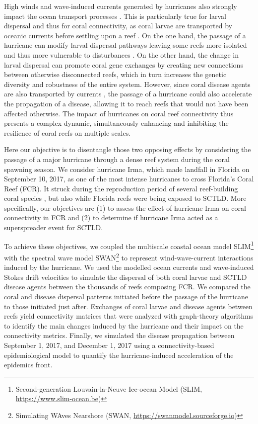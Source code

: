 \documentclass[fleqn,10pt]{wlscirep}
\begin{document}
High winds and wave-induced currents generated by hurricanes also strongly impact the ocean transport processes \citep{DobbyIrma,Oey2007May,liu2020impacts}. This is particularly true for larval dispersal and thus for coral connectivity, as coral larvae are transported by oceanic currents before settling upon a reef \citep{Shulman1995Oct}. On the one hand, the passage of a hurricane can modify larval dispersal pathways leaving some reefs more isolated and thus more vulnerable to disturbances \citep{grimaldi2022hydrodynamic}. On the other hand, the change in larval dispersal can promote coral gene exchanges by creating new connections between otherwise disconnected reefs, which in turn increases the genetic diversity and robustness of the entire system. However, since coral disease agents are also transported by currents \citep{DobbySCTLD}, the passage of a hurricane could also accelerate the propagation of a disease, allowing it to reach reefs that would not have been affected otherwise. The impact of hurricanes on coral reef connectivity thus presents a complex dynamic, simultaneously enhancing and inhibiting the resilience of coral reefs on multiple scales.

Here our objective is to disentangle those two opposing effects by considering the passage of a major hurricane through a dense reef system during the coral spawning season. We consider hurricane Irma, which made landfall in Florida on September 10, 2017, as one of the most intense hurricanes to cross Florida's Coral Reef (FCR). It struck during the reproduction period of several reef-building coral species \citep{quicklook2020}, but also while Florida reefs were being exposed to SCTLD. More specifically, our objectives are (1) to assess the effect of hurricane Irma on coral connectivity in FCR and (2) to determine if hurricane Irma acted as a superspreader event for SCTLD.

To achieve these objectives, we coupled the multiscale coastal ocean model SLIM\footnote{Second-generation Louvain-la-Neuve Ice-ocean Model (SLIM, \href{https://www.slim-ocean.be}{https://www.slim-ocean.be})} \citep{Lambrechts2008,Frys2020} with the spectral wave model SWAN\footnote{Simulating WAves Nearshore (SWAN, \href{https://swanmodel.sourceforge.io}{https://swanmodel.sourceforge.io})} \citep{Booij1999Apr,DobbyIrma} to represent wind-wave-current interactions induced by the hurricane. We used the modelled ocean currents and wave-induced Stokes drift velocities to simulate the dispersal of both coral larvae and SCTLD disease agents between the thousands of reefs composing FCR. We compared the coral and disease dispersal patterns initiated before the passage of the hurricane to those initiated just after. Exchanges of coral larvae and disease agents between reefs yield connectivity matrices that were analyzed with graph-theory algorithms to identify the main changes induced by the hurricane and their impact on the connectivity metrics. Finally, we simulated the disease propagation between September 1, 2017, and December 1, 2017 using a connectivity-based epidemiological model \citep{DobbySCTLD} to quantify the hurricane-induced acceleration of the epidemics front.
\end{document}
